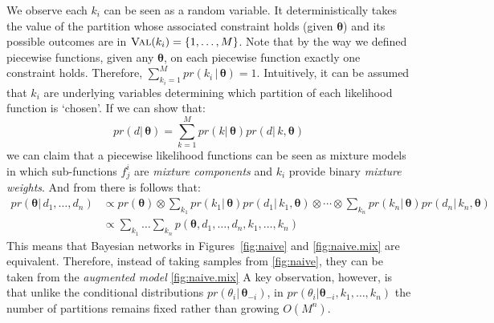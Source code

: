 We observe each $k_i$ can be seen as a random variable. 
It deterministically takes the value of the partition whose associated constraint holds (given $\boldsymbol\theta$) and its possible outcomes are in $\textsc{Val}(k_i) = \{1, \ldots, M\}$. 
Note that by the way we defined piecewise functions, given any $\boldsymbol\theta$, 
on each piecewise function exactly one constraint holds. Therefore, 
$\sum_{k_i = 1}^M pr(k_i \,|\, \boldsymbol\theta) = 1$.
Intuitively, it can be assumed that $k_i$ are underlying variables determining which partition of each likelihood function is `chosen'.  
If we can show that: 
\begin{equation}
\label{e:aaaax}
pr(d | \, \boldsymbol\theta) = \sum_{k = 1}^M pr(k | \, \boldsymbol\theta) pr(d | \, k, \boldsymbol\theta)
\end{equation}
we can claim that a piecewise likelihood functions can be seen 
as mixture models in which sub-functions $f^i_j$ are \emph{mixture components} and 
 $k_i$ provide binary \emph{mixture weights}. And from there is follows that:
\begin{align*}
pr(\boldsymbol\theta | \, d_1, \ldots, d_n) 
&\propto
pr(\boldsymbol\theta) \otimes
\sum_{k_1}pr(k_1 | \, \boldsymbol\theta) pr(d_1 | \, k_1, \boldsymbol\theta) \otimes
\cdots \otimes
\sum_{k_n}pr(k_n | \, \boldsymbol\theta) pr(d_n | \, k_n, \boldsymbol\theta)
\\
&\propto
\sum_{k_1} \ldots \sum_{k_n} p(\boldsymbol\theta, d_1, \ldots, d_n, k_1, \ldots, k_n) 
\end{align*}
This means that Bayesian networks in Figures~\ref{fig:naive} and \ref{fig:naive.mix} are equivalent.
Therefore, instead of taking samples from \ref{fig:naive}, 
they can be taken from the \emph{augmented model} \ref{fig:naive.mix} 
A key observation, however, is that 
unlike the conditional distributions $pr(\theta_i | \, \boldsymbol\theta_{-i})$, 
in $pr(\theta_i | \boldsymbol\theta_{-i}, k_1, \ldots, k_n)$ 
the number of partitions remains fixed rather than growing $O(M^n)$.

